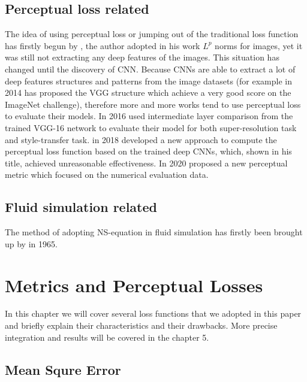 \documentclass[a4paper,12pt,twoside]{report}
\begin{document}
\section{Perceptual loss related}
The idea of using perceptual loss or jumping out of the traditional loss function has firstly begun by \cite{wang2004}, the author adopted in his work $L^p$ norms for images, yet it was still not extracting any deep features of the images. This situation has changed  until the discovery of CNN. Because CNNs are able to extract a lot of deep features structures and patterns from the image datasets (for example in 2014 \cite{simonyan2014very} has proposed the VGG structure which achieve a very good score on the ImageNet challenge), therefore more and more  works tend to use perceptual loss to evaluate their models\cite{amirshahi2016, berardino2017, bosse2016, kang2014, kim2017}. In 2016 \cite{johnson2016perceptual} used intermediate layer comparison from the trained VGG-16 network to evaluate their model for both super-resolution task and style-transfer task.  in 2018 \cite{zhang2018perceptual} developed a new approach to compute the perceptual loss function based on the trained deep CNNs, which, shown in his title, achieved unreasonable effectiveness. In 2020 \cite{kohl2020learning} proposed a new perceptual metric which focused on the numerical evaluation data.
\section{Fluid simulation related}
The method of adopting NS-equation in fluid simulation has firstly been brought up by \cite{doi:10.1063/1.1761178} in 1965.



\chapter{Metrics and Perceptual Losses}

In this chapter we will cover several loss functions that we adopted in this paper and briefly explain their characteristics and their drawbacks. More precise integration and results will be covered in the chapter 5.

\section{Mean Squre Error}
\end{document}
